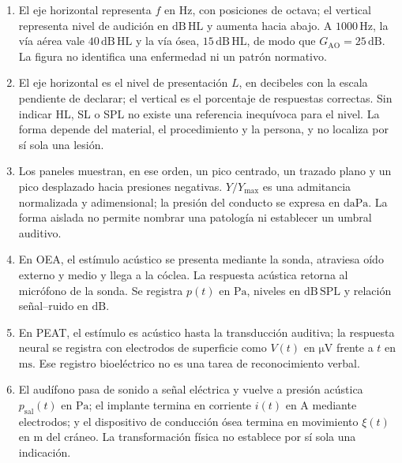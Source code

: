 \begin{enumerate}[label=\textbf{G\arabic*.},leftmargin=*]
    \item El eje horizontal representa \(f\) en \(\mathrm{Hz}\), con posiciones
    de octava; el vertical representa nivel de audición en
    \(\mathrm{dB\,HL}\) y aumenta hacia abajo. A \(1000\,\mathrm{Hz}\), la vía
    aérea vale \(40\,\mathrm{dB\,HL}\) y la vía ósea,
    \(15\,\mathrm{dB\,HL}\), de modo que
    \(G_{\mathrm{AO}}=25\,\mathrm{dB}\). La figura no identifica una
    enfermedad ni un patrón normativo.

    \item El eje horizontal es el nivel de presentación \(L\), en decibeles
    con la escala pendiente de declarar; el vertical es el porcentaje de
    respuestas correctas. Sin indicar HL, SL o SPL no existe una referencia
    inequívoca para el nivel. La forma depende del material, el procedimiento
    y la persona, y no localiza por sí sola una lesión.

    \item Los paneles muestran, en ese orden, un pico centrado, un trazado plano
    y un pico desplazado hacia presiones negativas. \(Y/Y_{\max}\) es una
    admitancia normalizada y adimensional; la presión del conducto se expresa
    en \(\mathrm{daPa}\). La forma aislada no permite nombrar una patología ni
    establecer un umbral auditivo.

    \item En OEA, el estímulo acústico se presenta mediante la sonda, atraviesa
    oído externo y medio y llega a la cóclea. La respuesta acústica retorna al
    micrófono de la sonda. Se registra \(p(t)\) en \(\mathrm{Pa}\), niveles en
    \(\mathrm{dB\,SPL}\) y relación señal--ruido en \(\mathrm{dB}\).

    \item En PEAT, el estímulo es acústico hasta la transducción auditiva; la
    respuesta neural se registra con electrodos de superficie como
    \(V(t)\) en \(\mathrm{\mu V}\) frente a \(t\) en \(\mathrm{ms}\). Ese
    registro bioeléctrico no es una tarea de reconocimiento verbal.

    \item El audífono pasa de sonido a señal eléctrica y vuelve a presión
    acústica \(p_{\mathrm{sal}}(t)\) en \(\mathrm{Pa}\); el implante termina en
    corriente \(i(t)\) en \(\mathrm{A}\) mediante electrodos; y el dispositivo
    de conducción ósea termina en movimiento \(\xi(t)\) en \(\mathrm{m}\) del
    cráneo. La transformación física no establece por sí sola una indicación.
\end{enumerate}

